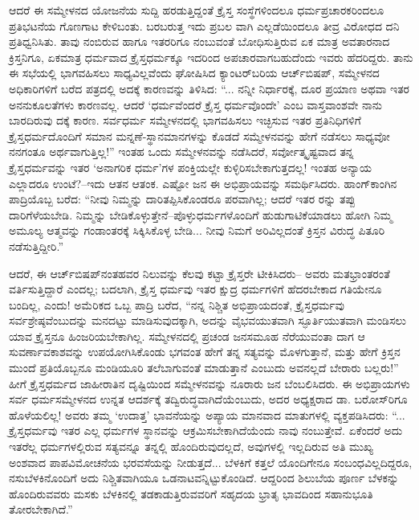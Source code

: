 ಆದರೆ ಈ ಸಮ್ಮೇಳನದ ಯೋಜನೆಯ ಸುದ್ದಿ ಹರಡುತ್ತಿದ್ದಂತೆ ಕ್ರೈಸ್ತ ಸಂಸ್ಥೆಗಳಿಂದಲೂ ಧರ್ಮಪ್ರಚಾರಕರಿಂದಲೂ ಪ್ರತಿಭಟನೆಯ ಗೊಣಗಾಟ ಕೇಳಿಬಂತು. ಬರಬರುತ್ತ ಇದು ಪ್ರಬಲ ವಾಗಿ ಎಲ್ಲಡೆಯಿಂದಲೂ ತೀವ್ರ ವಿರೋಧದ ದನಿ ಪ್ರತಿಧ್ವನಿಸಿತು. ತಾವು ನಂಬಿರುವ ಹಾಗೂ ಇತರರಿಗೂ ನಂಬುವಂತೆ ಬೋಧಿಸುತ್ತಿರುವ ಏಕ ಮಾತ್ರ ಅವತಾರನಾದ ಕ್ರಿಸ್ತನಿಗೂ, ಏಕಮಾತ್ರ ಧರ್ಮವಾದ ಕ್ರೈಸ್ತಧರ್ಮಕ್ಕೂ ಇದರಿಂದ ಅಪಚಾರವಾಗಬಹುದೆಂದು ಇವರು ಹೆದರಿದ್ದರು. ತಾನು ಈ ಸಭೆಯಲ್ಲಿ ಭಾಗವಹಿಸಲು ಸಾಧ್ಯವಿಲ್ಲವೆಂದು ಘೋಷಿಸಿದ ಕ್ಯಾಂಟರ್​ಬರಿಯ ಆರ್ಚ್​ಬಿಷಪ್, ಸಮ್ಮೇಳನದ ಅಧಿಕಾರಿಗಳಿಗೆ ಬರೆದ ಪತ್ರದಲ್ಲಿ ಅದಕ್ಕೆ ಕಾರಣವನ್ನು ತಿಳಿಸಿದ: “... ನನ್ನೀ ನಿರ್ಧಾರಕ್ಕೆ, ದೂರ ಪ್ರಯಾಣ ಅಥವಾ ಇತರ ಅನನುಕೂಲತೆಗಳು ಕಾರಣವಲ್ಲ. ಆದರೆ ‘ಧರ್ಮವೆಂದರೆ ಕ್ರೈಸ್ತ ಧರ್ಮವೊಂದೇ’ ಎಂಬ ವಾಸ್ತವಾಂಶವೇ ನಾನು ಬಾರದಿರುವು ದಕ್ಕೆ ಕಾರಣ. ಸರ್ವಧರ್ಮ ಸಮ್ಮೇಳನದಲ್ಲಿ ಭಾಗವಹಿಸಲು ಇಚ್ಛಿಸುವ ಇತರ ಪ್ರತಿನಿಧಿಗಳಿಗೆ ಕ್ರೈಸ್ತಧರ್ಮದೊಂದಿಗೆ ಸಮಾನ ಮನ್ನಣೆ-ಸ್ಥಾನಮಾನಗಳನ್ನು ಕೊಡದೆ ಸಮ್ಮೇಳನವನ್ನು ಹೇಗೆ ನಡೆಸಲು ಸಾಧ್ಯವೋ ನನಗಂತೂ ಅರ್ಥವಾಗುತ್ತಿಲ್ಲ!” ಇಂತಹ ಒಂದು ಸಮ್ಮೇಳನವನ್ನು ನಡೆಸಿದರೆ, ಸರ್ವೋತ್ಕೃಷ್ಟವಾದ ತನ್ನ ಕ್ರೈಸ್ತಧರ್ಮವನ್ನು ಇತರ ‘ಅನಾಗರಿಕ ಧರ್ಮ’ಗಳ ಪಂಕ್ತಿಯಲ್ಲೇ ಕುಳ್ಳಿರಿಸಬೇಕಾಗುತ್ತದಲ್ಲ! ಇಂತಹ ಅನ್ಯಾಯ ಎಲ್ಲಾದರೂ ಉಂಟೆ?–ಇದು ಆತನ ಆತಂಕ. ಎಷ್ಟೋ ಜನ ಈ ಅಭಿಪ್ರಾಯವನ್ನು ಸಮರ್ಥಿಸಿದರು. ಹಾಂಗ್​ಕಾಂಗಿನ ಪಾದ್ರಿಯೊಬ್ಬ ಬರೆದ: “ನೀವು ನಿಮ್ಮನ್ನು ದಾರಿತಪ್ಪಿಸಿಕೊಂಡರೂ ಪರವಾಗಿಲ್ಲ; ಆದರೆ ಇತರ ರನ್ನು ತಪ್ಪು ದಾರಿಗೆಳೆಯಬೇಡಿ. ನಿಮ್ಮನ್ನು ಬೇಡಿಕೊಳ್ಳುತ್ತೇನೆ–ಪೊಳ್ಳುಧರ್ಮಗಳೊಂದಿಗೆ ಹುಡುಗಾಟಿಕೆಯಾಡಲು ಹೋಗಿ ನಿಮ್ಮ ಅಮೂಲ್ಯ ಆತ್ಮವನ್ನು ಗಂಡಾಂತರಕ್ಕೆ ಸಿಕ್ಕಿಸಿಕೊಳ್ಳ ಬೇಡಿ... ನೀವು ನಿಮಗೆ ಅರಿವಿಲ್ಲದಂತೆ ಕ್ರಿಸ್ತನ ವಿರುದ್ಧ ಪಿತೂರಿ ನಡೆಸುತ್ತಿದ್ದೀರಿ.”

ಆದರೆ, ಈ ಆರ್ಚ್​ಬಿಷಪ್​ನಂತಹವರ ನಿಲುವನ್ನು ಕೆಲವು ಕಟ್ಟಾ ಕ್ರೈಸ್ತರೇ ಟೀಕಿಸಿದರು– ಅವರು ಮತಭ್ರಾಂತರಂತೆ ವರ್ತಿಸುತ್ತಿದ್ದಾರೆ ಎಂದಲ್ಲ; ಬದಲಾಗಿ, ಕ್ರೈಸ್ತ ಧರ್ಮವು ಇತರ ಕ್ಷುದ್ರ ಧರ್ಮಗಳಿಗೆ ಹೆದರಬೇಕಾದ ಗತಿಯೇನೂ ಬಂದಿಲ್ಲ, ಎಂದು! ಅಮೆರಿಕದ ಒಬ್ಬ ಪಾದ್ರಿ ಬರೆದ, “ನನ್ನ ನಿಶ್ಚಿತ ಅಭಿಪ್ರಾಯದಂತೆ, ಕ್ರೈಸ್ತಧರ್ಮವು ಸರ್ವಶ್ರೇಷ್ಠವೆಂಬುದನ್ನು ಮನದಟ್ಟು ಮಾಡಿಸುವುದಕ್ಕಾಗಿ, ಅದನ್ನು ವೈಭವಯುತವಾಗಿ ಸ್ಫೂರ್ತಿಯುತವಾಗಿ ಮಂಡಿಸಲು ಯಾವ ಕ್ರೈಸ್ತನೂ ಹಿಂಜರಿಯಬೇಕಾಗಿಲ್ಲ. ಸಮ್ಮೇಳನದಲ್ಲಿ ಪ್ರಚಂಡ ಜನಸಮೂಹ ನೆರೆಯುವಂತಾ ದಾಗ ಆ ಸುವರ್ಣಾವಕಾಶವನ್ನು ಉಪಯೋಗಿಸಿಕೊಂಡು ಭಗವಂತ ಹೇಗೆ ತನ್ನ ಸತ್ಯವನ್ನು ಮೊಳಗುತ್ತಾನೆ, ಮತ್ತು ಹೇಗೆ ಕ್ರಿಸ್ತನ ಮುಂದೆ ಪ್ರತಿಯೊಬ್ಬನೂ ಮಂಡಿಯೂರಿ ತಲೆಬಾಗುವಂತೆ ಮಾಡುತ್ತಾನೆ ಎಂಬುದು ಅವನಲ್ಲದೆ ಬೇರಾರು ಬಲ್ಲರು!” ಹೀಗೆ ಕ್ರೈಸ್ತಧರ್ಮದ ಜಾಹೀರಾತಿನ ದೃಷ್ಟಿಯಿಂದ ಸಮ್ಮೇಳನವನ್ನು ನೂರಾರು ಜನ ಬೆಂಬಲಿಸಿದರು. ಈ ಅಭಿಪ್ರಾಯಗಳು ಸರ್ವ ಧರ್ಮಸಮ್ಮೇಳನದ ಉನ್ನತ ಆದರ್ಶಕ್ಕೆ ತದ್ವಿರುದ್ಧವಾಗಿದೆಯೆಂಬುದು, ಅದರ ಅಧ್ಯಕ್ಷರಾದ ಡಾ. ಬರೋಸ್​ರಿಗೂ ಹೊಳೆಯಲಿಲ್ಲ! ಅವರು ತಮ್ಮ ‘ಉದಾತ್ತ’ ಭಾವನೆಯನ್ನು ಅಪ್ಯಾಯ ಮಾನವಾದ ಮಾತುಗಳಲ್ಲಿ ವ್ಯಕ್ತಪಡಿಸಿದರು: “... ಕ್ರೈಸ್ತಧರ್ಮವು ಇತರ ಎಲ್ಲ ಧರ್ಮಗಳ ಸ್ಥಾನವನ್ನು ಆಕ್ರಮಿಸಬೇಕಾಗಿದೆಯೆಂದು ನಾವು ನಂಬುತ್ತೇವೆ. ಏಕೆಂದರೆ ಅದು ಇತರೆಲ್ಲ ಧರ್ಮಗಳಲ್ಲಿರುವ ಸತ್ಯವನ್ನೂ ತನ್ನಲ್ಲಿ ಹೊಂದಿರುವುದಲ್ಲದೆ, ಅವುಗಳಲ್ಲಿ ಇಲ್ಲದಿರುವ ಅತಿ ಮುಖ್ಯ ಅಂಶವಾದ ಪಾಪವಿಮೋಚನೆಯ ಭರವಸೆಯನ್ನು ನೀಡುತ್ತದೆ... ಬೆಳಕಿಗೆ ಕತ್ತಲೆ ಯೊಂದಿಗೇನೂ ಸಂಬಂಧವಿಲ್ಲದಿದ್ದರೂ, ನಸುಬೆಳಕಿನೊಂದಿಗೆ ಅದು ನಿಶ್ಚಿತವಾಗಿಯೂ ಒಡನಾಟವನ್ನಿಟ್ಟುಕೊಂಡಿದೆ. ಆದ್ದರಿಂದ ಶಿಲುಬೆಯ ಪೂರ್ಣ ಬೆಳಕನ್ನು ಹೊಂದಿರುವವರು ಮಸಕು ಬೆಳಕಿನಲ್ಲಿ ತಡಕಾಡುತ್ತಿರುವವರಿಗೆ ಸಹೃದಯ ಭ್ರಾತೃ ಭಾವದಿಂದ ಸಹಾನುಭೂತಿ ತೋರಬೇಕಾಗಿದೆ.”

